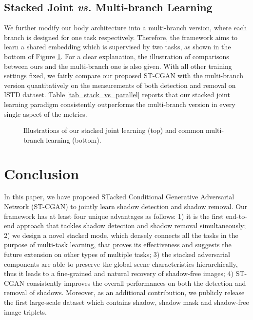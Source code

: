 \documentclass[10pt,twocolumn,letterpaper]{article}
\begin{document}
\subsection{Stacked Joint \emph{vs.} Multi-branch Learning}
We further modify our body architecture into a multi-branch version, where each branch is designed for one task respectively. Therefore, the framework aims to learn a shared embedding which is supervised by two tasks, as shown in the bottom of Figure \ref{fig_parallel_cropped}. For a clear explanation, the illustration of comparisons between ours and the multi-branch one is also given.  With all other training settings fixed, we fairly compare our proposed ST-CGAN with the multi-branch version quantitatively on the measurements of both detection and removal on ISTD dataset. Table \ref{tab_stack_vs_parallel} reports that our stacked joint learning paradigm consistently outperforms the multi-branch version in every single aspect of the metrics.

\begin{figure}[t]
	\vspace{-2pt}
	\begin{center}
		\setlength{\fboxrule}{0pt}
	\end{center}
	\vspace{-10pt}	
	\caption{Illustrations of our stacked joint learning (top) and common multi-branch learning (bottom).}
	\label{fig_parallel_cropped}
	\vspace{-10pt}	
\end{figure}
\section{Conclusion}
In this paper, we have proposed STacked Conditional Generative Adversarial Network (ST-CGAN) to jointly learn shadow detection and shadow removal. Our framework has at least four unique advantages as follows: 1) it is the first end-to-end approach that tackles shadow detection and shadow removal simultaneously; 2) we design a novel stacked mode, which densely connects all the tasks in the purpose of multi-task learning, that proves its effectiveness and suggests the future extension on other types of multiple tasks; 3) the stacked adversarial components are able to preserve the global scene characteristics hierarchically, thus it leads to a fine-grained and natural recovery of shadow-free images; 4) ST-CGAN consistently improves the overall performances on both the detection and removal of shadows. Moreover, as an additional contribution, we publicly release the first large-scale dataset which contains shadow, shadow mask and shadow-free image triplets.







{\small


}
\end{document}
